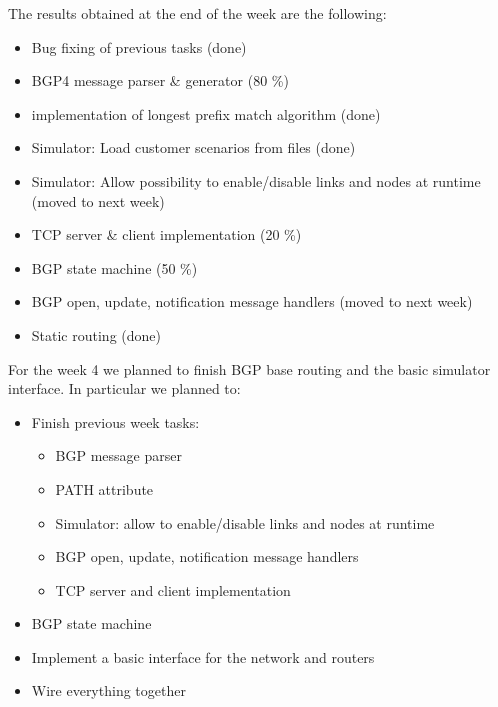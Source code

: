 The results obtained at the end of the week are the following:

\begin{itemize}
    \item Bug fixing of previous tasks (done)
    \item BGP4 message parser \& generator (80 \%)
    \item implementation of longest prefix match algorithm (done)
    \item Simulator: Load customer scenarios from files (done)
    \item Simulator: Allow possibility to enable/disable links and nodes at runtime (moved to next week)
    \item TCP server \& client implementation (20 \%)
    \item BGP state machine (50 \%)
    \item BGP open, update, notification message handlers (moved to next week)
    \item Static routing (done)
\end{itemize}

For the week 4 we planned to finish BGP base routing and the basic simulator interface.
In particular we planned to:
\begin{itemize}
    \item Finish previous week tasks:
    \begin{itemize}
        \item BGP message parser
        \item PATH attribute
        \item Simulator: allow to enable/disable links and nodes at runtime
        \item BGP open, update, notification message handlers
        \item TCP server and client implementation
    \end{itemize}
    \item BGP state machine
    \item Implement a basic interface for the network and routers
    \item Wire everything together
\end{itemize}

